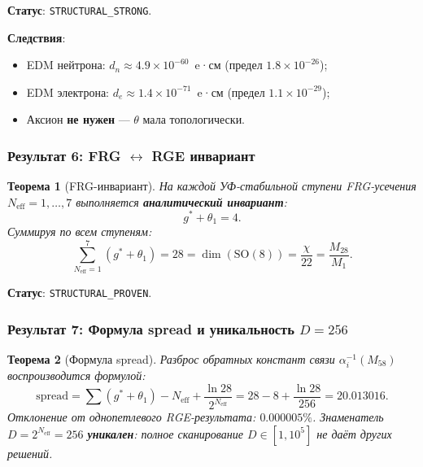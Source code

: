 \documentclass[11pt,a4paper]{article}
\newcommand{\SO}{\ensuremath{\mathrm{SO}}}
\newtheorem{theorem}{Теорема}[section]
\theoremstyle{definition}
\begin{document}
\medskip\noindent
\textbf{Статус}: \texttt{STRUCTURAL\_STRONG}.

\medskip\noindent
\textbf{Следствия}:
\begin{itemize}
    \item EDM нейтрона: $d_n \approx 4.9 \times 10^{-60}$~e·см
          (предел $1.8 \times 10^{-26}$);
    \item EDM электрона: $d_e \approx 1.4 \times 10^{-71}$~e·см
          (предел $1.1 \times 10^{-29}$);
    \item Аксион \textbf{не нужен} — $\theta$ мала топологически.
\end{itemize}

\subsubsection{Результат 6: FRG \texorpdfstring{$\leftrightarrow$}{} RGE инвариант}

\begin{theorem}[FRG-инвариант]
\label{thm:conclusion-frg}
На каждой УФ-стабильной ступени FRG-усечения $N_{\text{eff}} = 1, \ldots, 7$
выполняется \textbf{аналитический инвариант}:
\begin{equation}
    \boxed{
    g^* + \theta_1 = 4.
    }
    \label{eq:conclusion-invariant}
\end{equation}
Суммируя по всем ступеням:
\begin{equation}
    \boxed{
    \sum_{N_{\text{eff}} = 1}^{7} (g^* + \theta_1) = 28
    = \dim(\SO(8)) = \frac{\chi}{22} = \frac{M_{28}}{M_1}.
    }
    \label{eq:conclusion-sum-28}
\end{equation}
\end{theorem}

\medskip\noindent
\textbf{Статус}: \texttt{STRUCTURAL\_PROVEN}.

\subsubsection{Результат 7: Формула spread и уникальность \texorpdfstring{$D = 256$}{D = 256}}

\begin{theorem}[Формула spread]
\label{thm:conclusion-spread}
Разброс обратных констант связи $\alpha_i^{-1}(M_{58})$
воспроизводится формулой:
\begin{equation}
    \boxed{
    \text{spread} = \sum(g^* + \theta_1) - N_{\text{eff}}
    + \frac{\ln 28}{2^{N_{\text{eff}}}}
    = 28 - 8 + \frac{\ln 28}{256}
    = 20.013016.
    }
    \label{eq:conclusion-spread}
\end{equation}
Отклонение от однопетлевого RGE-результата:
$\mathbf{0.000005\%}$.
Знаменатель $D = 2^{N_{\text{eff}}} = 256$ \textbf{уникален}:
полное сканирование $D \in [1, 10^5]$ не даёт других решений.
\end{theorem}
\end{document}
